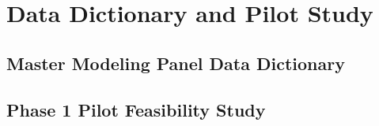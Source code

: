 \chapter{Data Dictionary and Pilot Study} \label{app:data_dict}

\section{Master Modeling Panel Data Dictionary}

\section{Phase 1 Pilot Feasibility Study}
